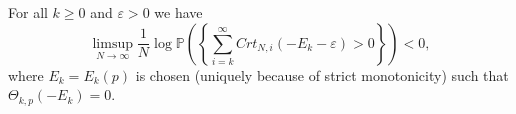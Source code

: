 \begin{theorem}
	For all $k\geq 0$ and $\varepsilon>0$ we have
	\begin{equation}\label{thm:2.15}
		\limsup_{N\rightarrow\infty}\frac{1}{N}\log\mathbb P\left(\left\{\sum_{i=k}^\infty Crt_{N,i}(-E_k-\varepsilon)>0\right\}\right)<0,
	\end{equation}
	where $E_k=E_k(p)$ is chosen (uniquely because of strict monotonicity) such that $\Theta_{k,p}(-E_k)=0$.
\end{theorem}













